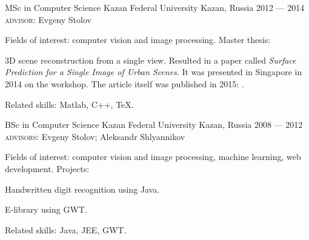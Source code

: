 

\begin{cventries}

  \cveducation
    {MSc in Computer Science} %
    {Kazan Federal University} %
    {Kazan, Russia} %
    {2012 --- 2014} %
    {\textsc{advisor}: Evgeny Stolov}
    {
    Fields of interest: computer vision and image processing. Master thesis:
      \begin{cvitems} %
      \item{3D scene reconstruction from a single view. Resulted in a paper called \textit{Surface Prediction for a Single Image of Urban Scenes}. It was presented in Singapore in 2014 on the  workshop. The article itself was published in 2015: .}
      \end{cvitems}
      Related skills: Matlab, C++, \TeX.
    }
    
  \cveducation
    {BSc in Computer Science} %
    {Kazan Federal University} %
    {Kazan, Russia} %
    {2008 --- 2012} %
    {\textsc{advisors}: Evgeny Stolov; Aleksandr Shlyannikov}
    {
    Fields of interest: computer vision and image processing, machine learning, web development. Projects: 
      \begin{cvitems} %
      \item{Handwritten digit recognition using Java.}
      \item{E-library using GWT.}
      \end{cvitems}
      Related skills: Java, JEE, GWT.
    }

\end{cventries}
